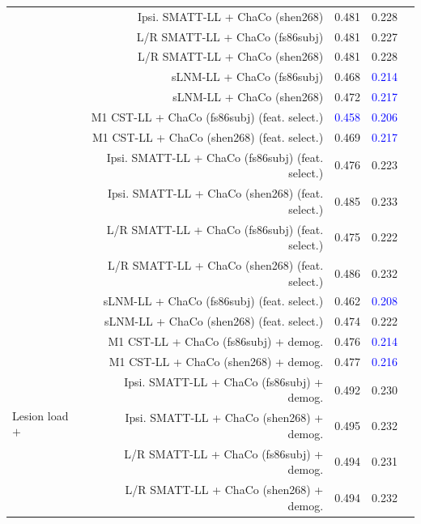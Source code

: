 \documentclass[10pt]{article}
\def\Plus{\texttt{+}}
\newcommand{\colorProcessBlue}[1]{\textcolor{ProcessBlue}{#1}}
\newcommand{\colorNavyBlue}[1]{\textcolor{NavyBlue}{#1}}
\newcommand{\colorBlue}[1]{\textcolor{Blue}{#1}}
\begin{document}
\begin{table}[h]
\begin{tabular}{lrrrr}
 & Ipsi. SMATT-LL + ChaCo (shen268) & \colorNavyBlue{0.481} & \colorNavyBlue{0.228} \\
 & L/R SMATT-LL + ChaCo (fs86subj) & \colorNavyBlue{0.481} & \colorNavyBlue{0.227} \\
 & L/R SMATT-LL + ChaCo (shen268) & \colorNavyBlue{0.481} & \colorNavyBlue{0.228} \\
 & sLNM-LL + ChaCo (fs86subj) & \colorNavyBlue{0.468} & \colorBlue{0.214} \\
 & sLNM-LL + ChaCo (shen268) & \colorNavyBlue{0.472} & \colorBlue{0.217} \\
 & M1 CST-LL + ChaCo (fs86subj) (feat. select.) & \colorBlue{0.458} & \colorBlue{0.206} \\
 & M1 CST-LL + ChaCo (shen268) (feat. select.) & \colorNavyBlue{0.469} & \colorBlue{0.217} \\
 & Ipsi. SMATT-LL + ChaCo (fs86subj) (feat. select.) & \colorNavyBlue{0.476} & \colorNavyBlue{0.223} \\
 & Ipsi. SMATT-LL + ChaCo (shen268) (feat. select.) & \colorNavyBlue{0.485} & \colorProcessBlue{0.233} \\
 & L/R SMATT-LL + ChaCo (fs86subj) (feat. select.) & \colorNavyBlue{0.475} & \colorNavyBlue{0.222} \\
 & L/R SMATT-LL + ChaCo (shen268) (feat. select.) & \colorNavyBlue{0.486} & \colorProcessBlue{0.232} \\
 & sLNM-LL + ChaCo (fs86subj) (feat. select.) & \colorNavyBlue{0.462} & \colorBlue{0.208} \\
 & sLNM-LL + ChaCo (shen268) (feat. select.) & \colorNavyBlue{0.474} & \colorNavyBlue{0.222} \\
\multirow[t]{16}{*}{Lesion load $\Plus$} & M1 CST-LL + ChaCo (fs86subj) + demog. & \colorNavyBlue{0.476} & \colorBlue{0.214} \\
 ChaCo $\Plus$ & M1 CST-LL + ChaCo (shen268) + demog. & \colorNavyBlue{0.477} & \colorBlue{0.216} \\
 Demographics & Ipsi. SMATT-LL + ChaCo (fs86subj) + demog. & \colorProcessBlue{0.492} & \colorProcessBlue{0.230} \\
 & Ipsi. SMATT-LL + ChaCo (shen268) + demog. & \colorProcessBlue{0.495} & \colorProcessBlue{0.232} \\
 & L/R SMATT-LL + ChaCo (fs86subj) + demog. & \colorProcessBlue{0.494} & \colorProcessBlue{0.231} \\
 & L/R SMATT-LL + ChaCo (shen268) + demog. & \colorProcessBlue{0.494} & \colorProcessBlue{0.232} \\

\end{tabular}
\end{table}
\end{document}
